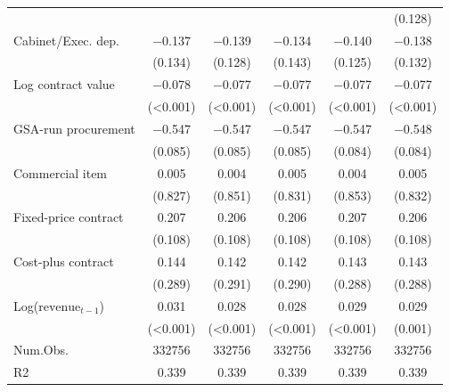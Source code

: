 \begin{tabular}[t]{lccccc}
 &  &  &  &  & (\num{0.128})\\
Cabinet/Exec. dep. & \num{-0.137} & \num{-0.139} & \num{-0.134} & \num{-0.140} & \num{-0.138}\\
 & (\num{0.134}) & (\num{0.128}) & (\num{0.143}) & (\num{0.125}) & (\num{0.132})\\
Log contract value & \num{-0.078} & \num{-0.077} & \num{-0.077} & \num{-0.077} & \num{-0.077}\\
 & (\num{<0.001}) & (\num{<0.001}) & (\num{<0.001}) & (\num{<0.001}) & (\num{<0.001})\\
GSA-run procurement & \num{-0.547} & \num{-0.547} & \num{-0.547} & \num{-0.547} & \num{-0.548}\\
 & (\num{0.085}) & (\num{0.085}) & (\num{0.085}) & (\num{0.084}) & (\num{0.084})\\
Commercial item & \num{0.005} & \num{0.004} & \num{0.005} & \num{0.004} & \num{0.005}\\
 & (\num{0.827}) & (\num{0.851}) & (\num{0.831}) & (\num{0.853}) & (\num{0.832})\\
Fixed-price contract & \num{0.207} & \num{0.206} & \num{0.206} & \num{0.207} & \num{0.206}\\
 & (\num{0.108}) & (\num{0.108}) & (\num{0.108}) & (\num{0.108}) & (\num{0.108})\\
Cost-plus contract & \num{0.144} & \num{0.142} & \num{0.142} & \num{0.143} & \num{0.143}\\
 & (\num{0.289}) & (\num{0.291}) & (\num{0.290}) & (\num{0.288}) & (\num{0.288})\\
Log($\text{revenue}_{t-1}$) & \num{0.031} & \num{0.028} & \num{0.028} & \num{0.029} & \num{0.029}\\
 & (\num{<0.001}) & (\num{<0.001}) & (\num{<0.001}) & (\num{<0.001}) & (\num{0.001})\\
\midrule
Num.Obs. & \num{332756} & \num{332756} & \num{332756} & \num{332756} & \num{332756}\\
R2 & \num{0.339} & \num{0.339} & \num{0.339} & \num{0.339} & \num{0.339}\\
\bottomrule
\end{tabular}
